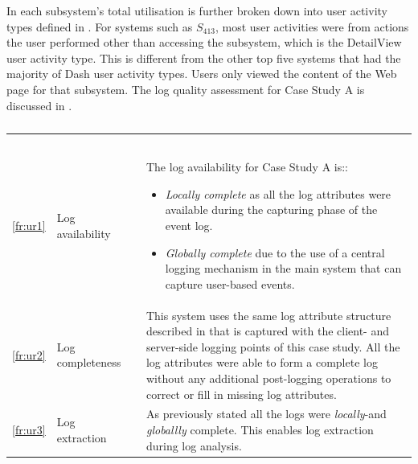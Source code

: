 In  each subsystem's total utilisation is further broken down into user activity types defined in . For systems such as $S_{413}$, most user activities were from actions the user performed other than accessing the subsystem, which is the DetailView user activity type. This is different from the other top five systems that had the majority of Dash user activity types. Users only viewed the content of the Web page for that subsystem. The log quality assessment for Case Study A is discussed in .

\begin{xltabular}{\textwidth}{clcX}
	\caption[Logging quality assessment of Case Study A]{\textit{Logging quality assessment of the test system}}\label{tbl:ch3_caseAQuality}\\
	\toprule
	 &  &  &  \\
	\midrule
	\endfirsthead

	\caption[]{\continueCaption} \\
	\toprule
	 &  &  &  \\
	\midrule
	\endhead

	\midrule
	 \\ 
	\endfoot
	\endlastfoot

	\ref{fr:ur1} & Log availability & \cmark & \RaggedRight The log availability for Case Study A is::
		\begin{itemize}
			\item \textit{Locally complete} as all the log attributes were available during the capturing phase of the event log. 
			\item \textit{Globally complete} due to the use of a central logging mechanism in the main system that can capture user-based events.  
		\end{itemize} \\
	\ref{fr:ur2} & Log completeness & \cmark & This system uses the same log attribute structure described in  that is captured with the client- and server-side logging points of this case study. All the log attributes were able to form a complete log without any additional post-logging operations to correct or fill in missing log attributes. \\
	\ref{fr:ur3} & Log extraction & \cmark & As previously stated all the logs were \textit{locally}-and \textit{globallly} complete. This enables log extraction during log analysis. \\
	\bottomrule
\end{xltabular}

